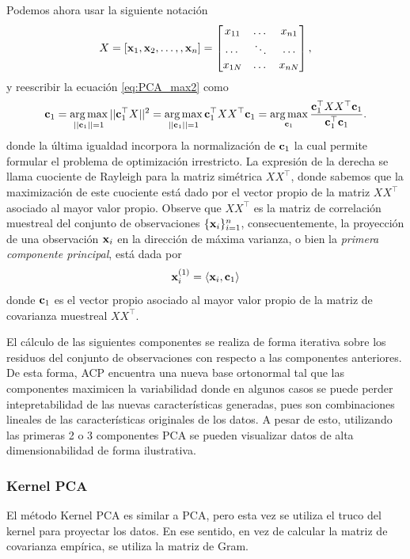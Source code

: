 Podemos ahora usar la siguiente notación
$$
X=[\mathbf{x}_1,\mathbf{x}_2,\ldots,,\mathbf{x}_n]=\begin{bmatrix}
        {x}_{11}    & \dots & {x}_{n1}  \\
        \cdots          & \ddots& \cdots        \\
        {x}_{1N}    & \dots & {x}_{nN}
        \end{bmatrix},
$$
y reescribir la ecuación \eqref{eq:PCA_max2} como 
\begin{align}
	\mathbf{c}_1 = \operatorname*{arg\,max}_{||\mathbf{c}_1||=1} ||\mathbf{c}_1^\top X||^2 
			= \operatorname*{arg\,max}_{||\mathbf{c}_1||=1} \mathbf{c}_1^\top XX^\top \mathbf{c}_1
			= \operatorname*{arg\,max}_{\mathbf{c}_1} \frac{\mathbf{c}_1^\top XX^\top \mathbf{c}_1}{\mathbf{c}_1^\top \mathbf{c}_1}. 
			\label{eq:PCA_max3}
\end{align}
donde la última igualdad incorpora la normalización de $\mathbf{c}_1$ la cual permite formular el problema de optimización irrestricto. La expresión de la derecha se llama cuociente de Rayleigh para la matriz simétrica $XX^\top$, donde sabemos que la maximización de este cuociente está dado por el vector propio de la matriz $XX^\top$ asociado al mayor valor propio. Observe que $XX^\top$ es la matriz de correlación muestreal del conjunto de observaciones $\{\mathbf{x}_i\}_{i=1}^n$, consecuentemente, la proyección de una observación $\mathbf{x}_i$ en la dirección de máxima varianza, o bien la \emph{primera componente principal}, está dada por 
\begin{equation}
	\mathbf{x}_i^{(1)} = \langle \mathbf{x}_i, \mathbf{c}_1 \rangle
\end{equation}
donde $\mathbf{c}_1$ es el vector propio asociado al mayor valor propio de la matriz de covarianza muestreal $XX^\top$.

El cálculo de las siguientes componentes se realiza de forma iterativa sobre los residuos del conjunto de observaciones con respecto a las componentes anteriores. De esta forma, ACP encuentra una nueva base ortonormal tal que las componentes maximicen la variabilidad donde en algunos casos se puede perder intepretabilidad de las nuevas características generadas, pues son combinaciones lineales de las características originales de los datos. A pesar de esto, utilizando las primeras 2 o 3 componentes PCA se pueden visualizar datos de alta dimensionabilidad de forma ilustrativa.


\subsubsection{Kernel PCA}
El método Kernel PCA es similar a PCA, pero esta vez se utiliza el truco del kernel para proyectar los datos. En ese sentido, en vez de calcular la matriz de covarianza empírica, se utiliza la matriz de Gram.

